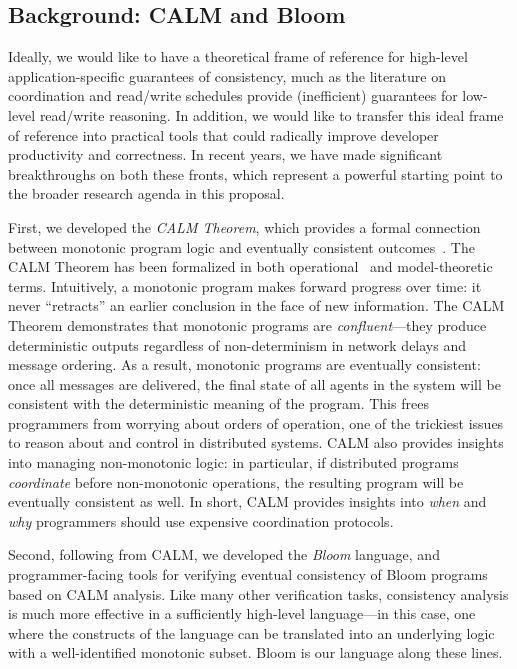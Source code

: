 \subsection{Background: CALM and Bloom}
Ideally, we would like to have a theoretical frame of reference for high-level application-specific guarantees of consistency, much as the literature on coordination and read/write schedules provide (inefficient) guarantees for low-level read/write reasoning. In addition, we would like to transfer this ideal frame of reference into practical tools that could radically improve developer productivity and correctness.  In recent years, we have made significant breakthroughs on both these fronts, which represent a powerful starting point to the broader research agenda in this proposal.

First, we developed the \emph{CALM Theorem}, which provides a formal connection
between monotonic program logic and eventually consistent outcomes~\cite{podskey}.  The CALM Theorem has been formalized in both operational~\cite{Ameloot2011,Abiteboul2011} and model-theoretic~\cite{marczak2012} terms.    Intuitively, a monotonic program makes forward progress over time: it never ``retracts'' an earlier conclusion in the face of new information.   The CALM Theorem demonstrates that monotonic programs are \emph{confluent}---they produce deterministic outputs regardless of non-determinism in network delays and message ordering.  As a result, monotonic programs are eventually consistent: once all messages are delivered, the final state of all agents in the system will be consistent with the deterministic meaning of the program.  This frees programmers from worrying about orders of operation, one of the trickiest issues to reason about and control in distributed systems.  CALM also provides insights into managing non-monotonic logic: in particular, if distributed programs \emph{coordinate} before non-monotonic operations, the resulting program will be eventually consistent as well.  In short, CALM provides insights into \emph{when} and \emph{why} programmers should use expensive coordination protocols.

Second, following from CALM, we developed the \emph{Bloom} language, and programmer-facing tools for verifying eventual consistency of Bloom programs based on CALM analysis. Like many other verification tasks, consistency analysis is much more effective in a sufficiently high-level language---in this case, one where the constructs of the language can be translated into an underlying logic with a well-identified monotonic subset. Bloom is our language along these lines. 

